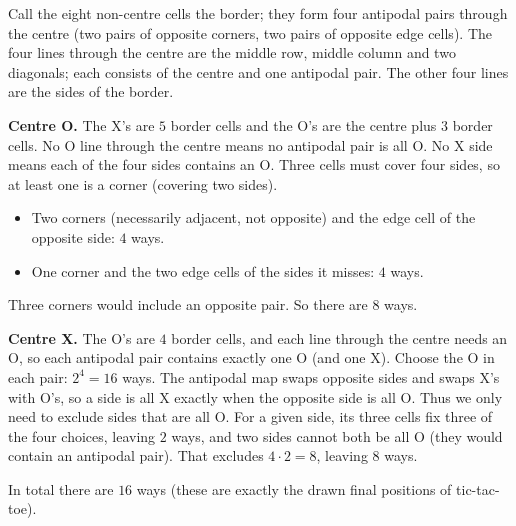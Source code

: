 Call the eight non-centre cells the border; they form four antipodal pairs through the centre (two pairs of opposite corners, two pairs of opposite edge cells). The four lines through the centre are the middle row, middle column and two diagonals; each consists of the centre and one antipodal pair. The other four lines are the sides of the border.

\textbf{Centre O.} The X's are $5$ border cells and the O's are the centre plus $3$ border cells. No O line through the centre means no antipodal pair is all O. No X side means each of the four sides contains an O. Three cells must cover four sides, so at least one is a corner (covering two sides).
\begin{itemize}
\item Two corners (necessarily adjacent, not opposite) and the edge cell of the opposite side: $4$ ways.
\item One corner and the two edge cells of the sides it misses: $4$ ways.
\end{itemize}
Three corners would include an opposite pair. So there are $8$ ways.

\textbf{Centre X.} The O's are $4$ border cells, and each line through the centre needs an O, so each antipodal pair contains exactly one O (and one X). Choose the O in each pair: $2^4=16$ ways. The antipodal map swaps opposite sides and swaps X's with O's, so a side is all X exactly when the opposite side is all O. Thus we only need to exclude sides that are all O. For a given side, its three cells fix three of the four choices, leaving $2$ ways, and two sides cannot both be all O (they would contain an antipodal pair). That excludes $4\cdot2=8$, leaving $8$ ways.

In total there are $\boxed{16}$ ways (these are exactly the drawn final positions of tic-tac-toe).
